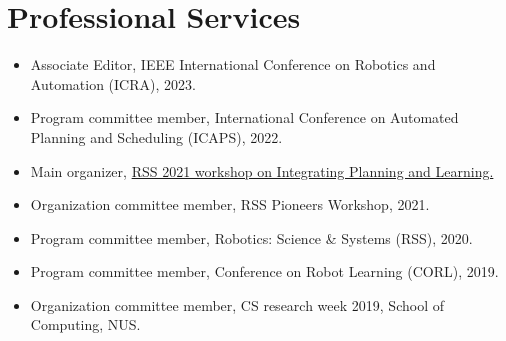 \documentclass[10pt,letterpaper,sans]{moderncv}        %
\begin{document}
\section{Professional Services}
{\begin{itemize}
\item Associate Editor, IEEE International Conference on Robotics and Automation (ICRA), 2023.
    \item Program committee member, International Conference on Automated Planning and Scheduling (ICAPS), 2022.
    \item Main organizer, \href{https://planandlearn.net/}{RSS 2021 workshop on Integrating Planning and Learning.}
    \item Organization committee member, RSS Pioneers Workshop, 2021.
    \item Program committee member, Robotics: Science \& Systems (RSS), 2020.
    \item Program committee member, Conference on Robot Learning (CORL), 2019.
    \item Organization committee member, CS research week 2019, School of Computing, NUS.
\end{itemize}}
\end{document}
